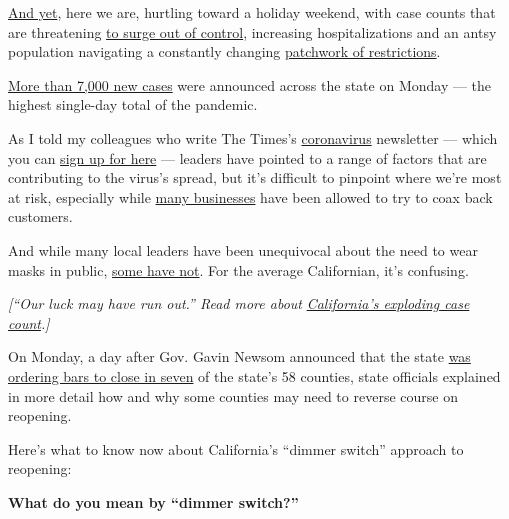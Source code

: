 \href{https://www.nytimes3xbfgragh.onion/2020/06/29/us/coronavirus-today.html}{And
yet}, here we are, hurtling toward a holiday weekend, with case counts
that are threatening
\href{https://www.nytimes3xbfgragh.onion/2020/06/29/us/california-coronavirus-reopening.html?smtyp=cur\&smid=tw-nytnational}{to
surge out of control}, increasing hospitalizations and an antsy
population navigating a constantly changing
\href{https://www.nytimes3xbfgragh.onion/article/coronavirus-california-reopening-phases.html}{patchwork
of restrictions}.

\href{https://www.nytimes3xbfgragh.onion/2020/06/29/us/california-coronavirus-reopening.html?}{More
than 7,000 new cases} were announced across the state on Monday --- the
highest single-day total of the pandemic.

As I told my colleagues who write The Times's
\href{https://www.nytimes3xbfgragh.onion/2020/07/14/us/california-counties-reopening.html}{coronavirus}
newsletter --- which you can
\href{https://www.nytimes3xbfgragh.onion/newsletters/coronavirus-briefing}{sign
up for here} --- leaders have pointed to a range of factors that are
contributing to the virus's spread, but it's difficult to pinpoint where
we're most at risk, especially while
\href{https://www.nytimes3xbfgragh.onion/2020/06/25/us/coronavirus-oakland-reopening-bar.html?}{many
businesses} have been allowed to try to coax back customers.

And while many local leaders have been unequivocal about the need to
wear masks in public,
\href{https://www.cbsnews.com/news/california-budget-crisis-gavin-newsom-face-mask-threaten-funds/}{some
have not}. For the average Californian, it's confusing.

\emph{{[}``Our luck may have run out.'' Read more about}
\href{https://www.nytimes3xbfgragh.onion/2020/06/29/us/california-coronavirus-reopening.html?smtyp=cur\&smid=tw-nytnational}{\emph{California's
exploding case count}}\emph{.{]}}

On Monday, a day after Gov. Gavin Newsom announced that the state
\href{https://www.cdph.ca.gov/Programs/CID/DCDC/Pages/COVID-19/Bar-Closure-Guidance.aspx}{was
ordering bars to close in seven} of the state's 58 counties, state
officials explained in more detail how and why some counties may need to
reverse course on reopening.

Here's what to know now about California's ``dimmer switch'' approach to
reopening:

\textbf{What do you mean by ``dimmer switch?''}

